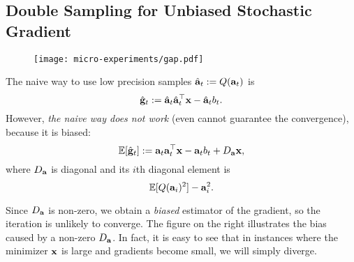 \vspace{-0.5em}
\subsection{Double Sampling for Unbiased Stochastic Gradient}
\vspace{-0.5em}
\begin{wrapfigure}{r}{0.23\textwidth}
  \begin{center}
    \texttt{[image: micro-experiments/gap.pdf]}
  \end{center}
  \label{fig:gap}
\end{wrapfigure}
The naive way to use low precision samples $\hat{{\bf a}}_t := Q({\bf a}_t)$ is 
\[
\hat{{\bf g}}_t := \hat{{\bf a}}_t \hat{{\bf a}}_t^\top {\bf x} - \hat{{\bf a}}_t b_t.
\]
However, \emph{the naive way does not work} (even cannot guarantee the convergence), because it is biased: 
\[
\mathbb{E}[\hat{{\bf g}}_t] := {\bf a}_t {\bf a}_t^\top {\bf x} - {\bf a}_t b_t + D_{{\bf a}} {\bf x}, 
\]
where $D_{{\bf a}}$ is diagonal and its $i$th diagonal element is 
\[
\mathbb{E}[ Q({\bf a}_i)^2 ] - {\bf a}_i^2.
\]
%


\vspace{-0.5em}
Since $D_{{\bf a}}$ is non-zero, we obtain a \emph{biased} estimator of the gradient, so the iteration is unlikely to converge. 
The figure on the right illustrates the bias caused by a non-zero $D_{{\bf a}}$. In fact, it is easy to see that in instances where the minimizer ${\bf x}$ is large and gradients become small, we will simply diverge. 

